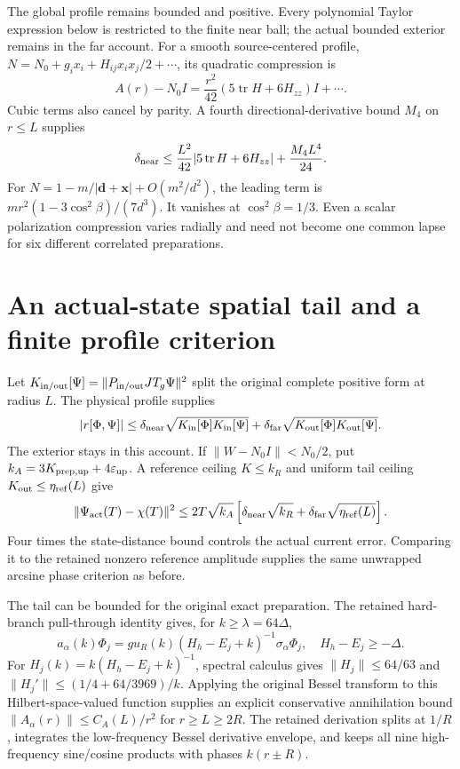 The global profile remains bounded and positive. Every polynomial Taylor expression below is restricted to the finite near ball; the actual bounded exterior remains in the far account. For a smooth source-centered profile, $N=N_0+g_ix_i+H_{ij}x_ix_j/2+\cdots$, its quadratic compression is
\[
 A(r)-N_0I=\frac{r^2}{42}(5\operatorname{tr}H+6H_{zz})I+\cdots.
\]
Cubic terms also cancel by parity. A fourth directional-derivative bound $M_4$ on $r\le L$ supplies
\[
 \delta_{\rm near}\le \frac{L^2}{42}|5\operatorname{tr}H+6H_{zz}|+\frac{M_4L^4}{24}.
\]
For $N=1-m/|\mathbf d+\mathbf x|+O(m^2/d^2)$, the leading term is $mr^2(1-3\cos^2\beta)/(7d^3)$. It vanishes at $\cos^2\beta=1/3$. Even a scalar polarization compression varies radially and need not become one common lapse for six different correlated preparations.

\section{An actual-state spatial tail and a finite profile criterion}
Let $K_{\rm in/out}[\Psi]=\|P_{\rm in/out}JT_g\Psi\|^2$ split the original complete positive form at radius $L$. The physical profile supplies
\[
 |r[\Phi,\Psi]|\le\delta_{\rm near}\sqrt{K_{\rm in}[\Phi]K_{\rm in}[\Psi]}
 +\delta_{\rm far}\sqrt{K_{\rm out}[\Phi]K_{\rm out}[\Psi]}.
\]
The exterior stays in this account. If $\|W-N_0I\|<N_0/2$, put $k_A=3K_{{\rm prep},\rm up}+4\varepsilon_{\rm up}$. A reference ceiling $K\le k_R$ and uniform tail ceiling $K_{\rm out}\le\eta_{\rm ref}(L)$ give
\[
 \|\Psi_{\rm act}(T)-\chi(T)\|^2
 \le2T\sqrt{k_A}\left[\delta_{\rm near}\sqrt{k_R}
                         +\delta_{\rm far}\sqrt{\eta_{\rm ref}(L)}\right].
\]
Four times the state-distance bound controls the actual current error. Comparing it to the retained nonzero reference amplitude supplies the same unwrapped arcsine phase criterion as before.

The tail can be bounded for the original exact preparation. The retained hard-branch pull-through identity gives, for $k\ge\lambda=64\Delta$,
\[
 a_\alpha(k)\Phi_j=g u_R(k)(H_h-E_j+k)^{-1}\sigma_\alpha\Phi_j,
 \quad H_h-E_j\ge-\Delta.
\]
For $H_j(k)=k(H_h-E_j+k)^{-1}$, spectral calculus gives $\|H_j\|\le64/63$ and $\|H_j'\|\le(1/4+64/3969)/k$. Applying the original Bessel transform to this Hilbert-space-valued function supplies an explicit conservative annihilation bound $\|A_\alpha(r)\|\le C_A(L)/r^2$ for $r\ge L\ge2R$. The retained derivation splits at $1/R$, integrates the low-frequency Bessel derivative envelope, and keeps all nine high-frequency sine/cosine products with phases $k(r\pm R)$.

